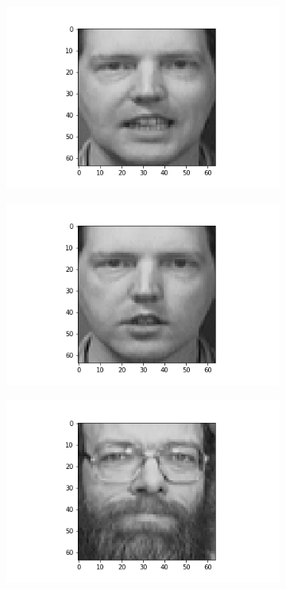 \documentclass[12pt, a4paper]{article}
\begin{document}
\begin{figure}[h]
\begin{subfigure}{0.3\linewidth}
    \end{subfigure}
    \newline
    \begin{subfigure}{0.3\linewidth}
        \centering
        \includegraphics[width=\linewidth]{images/q3/c/4/3.png}
    \end{subfigure}
    \hfill
    \begin{subfigure}{0.3\linewidth}
        \centering
        \includegraphics[width=\linewidth]{images/q3/c/4/4.png}
    \end{subfigure}
    \hfill
    \begin{subfigure}{0.3\linewidth}
        \centering
        \includegraphics[width=\linewidth]{images/q3/c/4/5.png}

\end{subfigure}
\end{figure}
\end{document}
